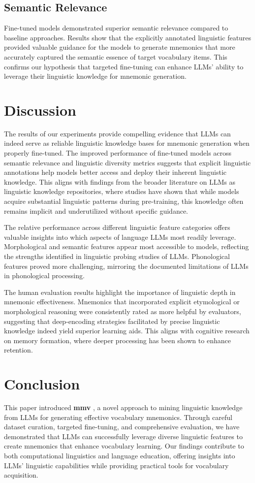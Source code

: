 \documentclass{article}
\newcommand{\shorttitle}{\textbf{mmv }}
\begin{document}
\subsection{Semantic Relevance} \label{sec:relevance-results}
Fine-tuned models demonstrated superior semantic relevance compared to baseline approaches. Results show that the explicitly annotated linguistic features provided valuable guidance for the models to generate mnemonics that more accurately captured the semantic essence of target vocabulary items. This confirms our hypothesis that targeted fine-tuning can enhance LLMs' ability to leverage their linguistic knowledge for mnemonic generation.

\section{Discussion}
The results of our experiments provide compelling evidence that LLMs can indeed serve as reliable linguistic knowledge bases for mnemonic generation when properly fine-tuned. The improved performance of fine-tuned models across semantic relevance and linguistic diversity metrics suggests that explicit linguistic annotations help models better access and deploy their inherent linguistic knowledge. This aligns with findings from the broader literature on LLMs as linguistic knowledge repositories, where studies have shown that while models acquire substantial linguistic patterns during pre-training, this knowledge often remains implicit and underutilized without specific guidance.

The relative performance across different linguistic feature categories offers valuable insights into which aspects of language LLMs most readily leverage. Morphological and semantic features appear most accessible to models, reflecting the strengths identified in linguistic probing studies of LLMs. Phonological features proved more challenging, mirroring the documented limitations of LLMs in phonological processing.

The human evaluation results highlight the importance of linguistic depth in mnemonic effectiveness. Mnemonics that incorporated explicit etymological or morphological reasoning were consistently rated as more helpful by evaluators, suggesting that deep-encoding strategies facilitated by precise linguistic knowledge indeed yield superior learning aids. This aligns with cognitive research on memory formation, where deeper processing has been shown to enhance retention.

\section{Conclusion}
This paper introduced \shorttitle, a novel approach to mining linguistic knowledge from LLMs for generating effective vocabulary mnemonics. Through careful dataset curation, targeted fine-tuning, and comprehensive evaluation, we have demonstrated that LLMs can successfully leverage diverse linguistic features to create mnemonics that enhance vocabulary learning. Our findings contribute to both computational linguistics and language education, offering insights into LLMs' linguistic capabilities while providing practical tools for vocabulary acquisition.
\end{document}
